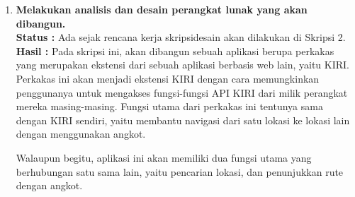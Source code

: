 \documentclass[a4paper,twoside]{article}
\begin{document}
\begin{enumerate}
\begin{lstlisting}[language=C, caption=Contoh sederhana penggunaan getopt-long, label=code:getopt-usage-long]
    	    case 'a':
	            if (verbose == 1) {
	                printf("Option '%s' was picked with argument '%s'.", long_options[option_index].name, optarg);
	            }
	            else
	                printf("a = %s", optarg);
	            putchar('\n');
	            break;

    	    case '?':
	            break;
	
	        default:
	            abort();
        }
    }

    if (optind < argc)
    {
        printf("Arguments passed without a corresponding option (argv): ");
        while (optind < argc) {
            printf("%s ", argv[optind++]);
        }
        putchar('\n');
    }

    exit(0);
}
\end{lstlisting}

		\item \textbf{Melakukan analisis dan desain perangkat lunak yang akan dibangun.}\\
		{\bf Status :} Ada sejak rencana kerja skripsi\textemdash desain akan dilakukan di Skripsi 2.\\
		{\bf Hasil :} Pada skripsi ini, akan dibangun sebuah aplikasi berupa perkakas \cl yang merupakan ekstensi dari sebuah aplikasi berbasis web lain, yaitu KIRI. Perkakas ini akan menjadi ekstensi KIRI dengan cara memungkinkan penggunanya untuk mengakses fungsi-fungsi API KIRI dari \cl milik perangkat mereka masing-masing. Fungsi utama dari perkakas ini tentunya sama dengan KIRI sendiri, yaitu membantu navigasi dari satu lokasi ke lokasi lain dengan menggunakan angkot.

Walaupun begitu, aplikasi ini akan memiliki dua fungsi utama yang berhubungan satu sama lain, yaitu pencarian lokasi, dan penunjukkan rute dengan angkot.


\end{enumerate}
\end{document}
